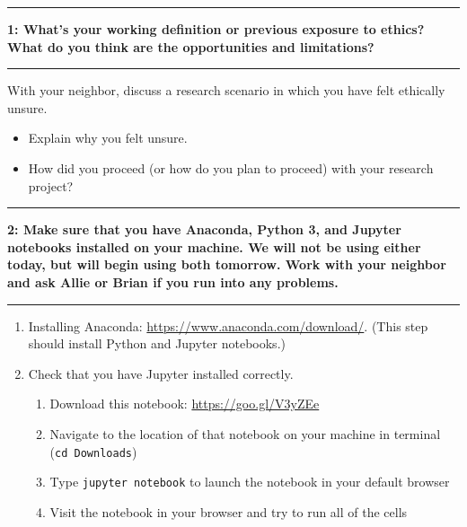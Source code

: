 \documentclass[11pt]{article}
\newcommand\question[2]{\vspace{.25in}\hrule\textbf{#1: #2}\vspace{.5em}\hrule\vspace{.10in}}
\begin{document}
\raggedright
\newcommand\NAME{Allie Morgan} 

\vspace{-0.2 in}
\question{1}{What's your working definition or previous exposure to ethics? What do you think are the opportunities and limitations?}
With your neighbor, discuss a research scenario in which you have felt ethically unsure. 
\begin{itemize}
\item Explain why you felt unsure. 
\item How did you proceed (or how do you plan to proceed) with your research project?
\end{itemize}

\vspace{1 in}
\question{2}{Make sure that you have Anaconda, Python 3, and Jupyter notebooks installed on your machine. We will not be using either today, but will begin using both tomorrow. Work with your neighbor and ask Allie or Brian if you run into any problems.} 
\begin{enumerate}
\item Installing Anaconda: \href{https://www.anaconda.com/download/}{https://www.anaconda.com/download/}. (This step should install Python and Jupyter notebooks.)
\item Check that you have Jupyter installed correctly.
	\begin{enumerate}
	\item Download this notebook: \href{https://goo.gl/V3yZEe}{https://goo.gl/V3yZEe}
	\item Navigate to the location of that notebook on your machine in terminal (\texttt{cd Downloads})
	\item Type \texttt{jupyter notebook} to launch the notebook in your default browser
	\item Visit the notebook in your browser and try to run all of the cells
	\end{enumerate}
\end{enumerate}
\end{document}
